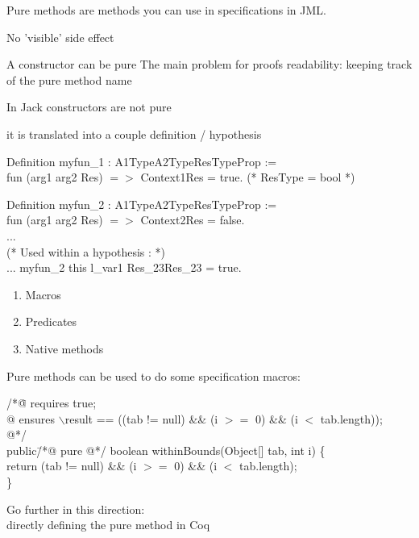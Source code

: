 
Pure methods are methods you can {\purple use in specifications} 
in JML.
\blist \small
\item No 'visible' side effect
\item A constructor can be pure
\elist
The main problem for proofs readability: keeping track of the pure method name

\small
\blist
\item In Jack constructors are not pure
\item it is translated into a couple definition / hypothesis 

\elist

{\purple Definition} myfun\_1 : A1Type\rarrow A2Type\rarrow ResType\rarrow Prop :=\\
{\purple fun} (arg1 arg2 Res) {\purple $=>$} Context1\rarrow Res = true. (* ResType = bool *)

{\purple Definition} myfun\_2 : A1Type\rarrow A2Type\rarrow ResType\rarrow Prop :=\\
{\purple fun} (arg1 arg2 Res) {\purple $=>$} Context2\rarrow Res = false.\\
...\\
(* Used within a hypothesis : *)\\
... \rarrow myfun\_2 this l\_var1 Res\_23\rarrow Res\_23 = true.\\


\begin{enumerate}
\item Macros
\item Predicates
\item Native methods


\end{enumerate}


\small
\blist
\item Pure methods can be used to do some specification macros:
\begin{tabbing}
 /*\=@ {\purple requires} true;\+\\
   @ {\purple ensures} $\backslash$result == ((tab != null) \&\& (i $>=$ 0) \&\& (i $<$ tab.length));\\
   @*/\-\\
 public\= /*@ {\purple pure} @*/ boolean withinBounds(Object[] tab, int i) \{\\
 	\>return (tab != null) \&\& (i $>=$ 0) \&\& (i $<$ tab.length);\\
 \}\\
 \end{tabbing}
\item Go {\purple further} in this direction:\\
directly defining the pure method in Coq 
\elist



